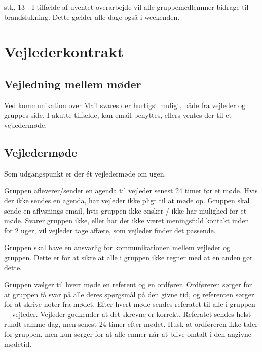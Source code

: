 \documentclass[../../main.tex]{subfiles}
\begin{document}
stk. 13 - I tilfælde af uventet overarbejde vil alle gruppemedlemmer bidrage til brandslukning. Dette gælder alle dage også i weekenden.\\


\section{Vejlederkontrakt}

\subsection{Vejledning mellem møder}
Ved kommunikation over Mail svares der hurtigst muligt, både fra vejleder og gruppes side.
I akutte tilfælde, kan email benyttes, ellers ventes der til et vejledermøde.

\subsection{Vejledermøde}
Som udgangspunkt er der ét vejledermøde om ugen.

Gruppen afleverer/sender en agenda til vejleder senest 24 timer før et møde.
Hvis der ikke sendes en agenda, har vejleder ikke pligt til at møde op. Gruppen
skal sende en aflysnings email, hvis gruppen ikke ønsker / ikke har mulighed
for et møde.
Svarer gruppen ikke, eller har der ikke været meningsfuld kontakt inden
for 2 uger, vil vejleder tage affære, som vejleder finder det passende.

Gruppen skal have en ansvarlig for kommunikationen mellem vejleder og gruppen.
Dette er for at sikre at alle i gruppen ikke regner med at en anden gør dette.

Gruppen vælger til hvert møde en referent og en ordfører.
Ordføreren sørger for at gruppen få svar på alle deres spørgsmål på den
givne tid, og referenten sørger for at skrive noter fra mødet.
Efter hvert møde sendes referatet til alle i gruppen +  vejleder.
Vejleder godkender at det skrevne er korrekt. Referatet sendes helst
rundt samme dag, men senest 24 timer efter mødet. Husk at ordføreren ikke
taler for gruppen, men kun sørger for at alle emner når at blive
omtalt i den angivne mødetid.
\end{document}
